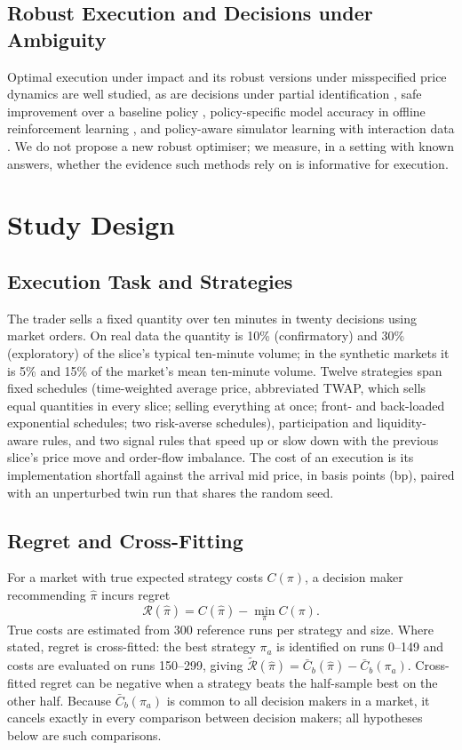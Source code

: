 \documentclass{ieeeaccess}
\begin{document}
\subsection{Robust Execution and Decisions under Ambiguity}
Optimal execution under impact \cite{almgren2001optimal} and its robust versions under misspecified price dynamics
\cite{schied2013robust} are well studied, as are decisions under partial identification \cite{manski2011choosing}, safe
improvement over a baseline policy \cite{laroche2019spibb,joshi2024safe}, policy-specific model accuracy in offline
reinforcement learning \cite{dong2023local}, and policy-aware simulator learning with interaction data
\cite{dann2026policyaware}. We do not propose a new robust optimiser; we measure, in a setting with known answers,
whether the evidence such methods rely on is informative for execution.

\section{Study Design}
\label{sec:design}

\subsection{Execution Task and Strategies}
The trader sells a fixed quantity over ten minutes in twenty decisions using market orders. On real data the quantity is
10\% (confirmatory) and 30\% (exploratory) of the slice's typical ten-minute volume; in the synthetic markets it is 5\%
and 15\% of the market's mean ten-minute volume. Twelve strategies span fixed schedules (time-weighted average price,
abbreviated TWAP, which sells equal quantities in every slice; selling everything at once; front- and back-loaded
exponential schedules; two risk-averse schedules), participation and liquidity-aware rules, and two signal rules that
speed up or slow down with the previous slice's price move and order-flow imbalance. The cost of an execution is its
implementation shortfall against the arrival mid price, in basis points (bp), paired with an unperturbed twin run that
shares the random seed.

\subsection{Regret and Cross-Fitting}
For a market with true expected strategy costs $C(\pi)$, a decision maker recommending $\hat\pi$ incurs regret
\begin{equation}
\mathcal{R}(\hat\pi)=C(\hat\pi)-\min_{\pi}C(\pi).
\label{eq:regret}
\end{equation}
True costs are estimated from 300 reference runs per strategy and size. Where stated, regret is cross-fitted: the best
strategy $\pi_a$ is identified on runs 0--149 and costs are evaluated on runs 150--299, giving
$\tilde{\mathcal{R}}(\hat\pi)=\bar{C}_b(\hat\pi)-\bar{C}_b(\pi_a)$. Cross-fitted regret can be negative when a strategy
beats the half-sample best on the other half. Because $\bar{C}_b(\pi_a)$ is common to all decision makers in a market,
it cancels exactly in every comparison between decision makers; all hypotheses below are such comparisons.
\end{document}
